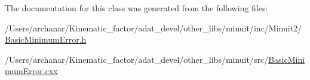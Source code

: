 The documentation for this class was generated from the following files\+:\begin{DoxyCompactItemize}
\item 
/\+Users/archanar/\+Kinematic\+\_\+factor/adat\+\_\+devel/other\+\_\+libs/minuit/inc/\+Minuit2/\mbox{\hyperlink{other__libs_2minuit_2inc_2Minuit2_2BasicMinimumError_8h}{Basic\+Minimum\+Error.\+h}}\item 
/\+Users/archanar/\+Kinematic\+\_\+factor/adat\+\_\+devel/other\+\_\+libs/minuit/src/\mbox{\hyperlink{BasicMinimumError_8cxx}{Basic\+Minimum\+Error.\+cxx}}\end{DoxyCompactItemize}

